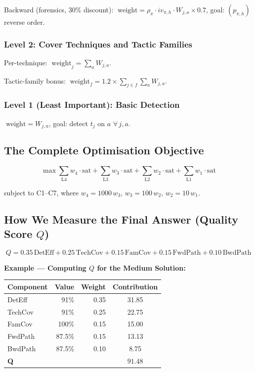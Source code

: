 \documentclass[journal]{IEEEtran}
\begin{document}
Backward (forensics, 30\% discount):
$\;\text{weight} = \rho_\pi \cdot iv_{\pi,h} \cdot W_{j,a}
\times 0.7$, \;goal: $(p_{\pi,h})$ reverse order.

\subsubsection{Level 2: Cover Techniques and Tactic Families}

Per-technique: $\;\text{weight}_j = \sum_a W_{j,a}$.

Tactic-family bonus: $\;\text{weight}_f = 1.2 \times
\sum_{j \in f}\sum_a W_{j,a}$.

\subsubsection{Level 1 (Least Important): Basic Detection}

$\;\text{weight} = W_{j,a}$,
\;goal: detect $t_j$ on $a$ $\forall\,j,a$.

\subsection{The Complete Optimisation Objective}

\begin{equation}
\max \sum_{\text{L4}} w_4 \cdot \mathrm{sat}
   + \sum_{\text{L3}} w_3 \cdot \mathrm{sat}
   + \sum_{\text{L2}} w_2 \cdot \mathrm{sat}
   + \sum_{\text{L1}} w_1 \cdot \mathrm{sat}
\end{equation}

subject to C1--C7, where
$w_4 = 1000\,w_3$, $w_3 = 100\,w_2$, $w_2 = 10\,w_1$.

\subsection{How We Measure the Final Answer (Quality Score
$Q$)}

\begin{equation}
  Q = 0.35\,\text{DetEff} + 0.25\,\text{TechCov}
    + 0.15\,\text{FamCov} + 0.15\,\text{FwdPath}
    + 0.10\,\text{BwdPath}
\end{equation}

\begin{examplebox}
\textbf{Example --- Computing $Q$ for the Medium Solution:}
\begin{center}
\small
\renewcommand{\arraystretch}{1.2}
\begin{tabular}{@{}lrrc@{}}
\toprule
\textbf{Component} & \textbf{Value} & \textbf{Weight} &
\textbf{Contribution} \\
\midrule
DetEff   & 91\%   & 0.35 & 31.85 \\
TechCov  & 91\%   & 0.25 & 22.75 \\
FamCov   & 100\%  & 0.15 & 15.00 \\
FwdPath  & 87.5\% & 0.15 & 13.13 \\
BwdPath  & 87.5\% & 0.10 &  8.75 \\
\midrule
\textbf{Q} & & & $\mathbf{91.48}$ \\
\bottomrule
\end{tabular}
\end{center}
\end{examplebox}
\end{document}
